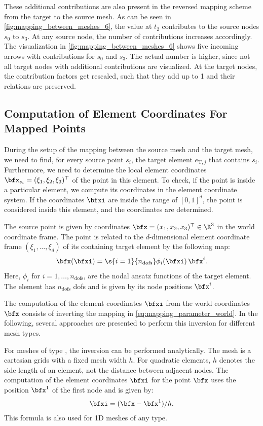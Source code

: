 These additional contributions are also present in the reversed mapping scheme from the target to the source mesh. As can be seen in \cref{fig:mapping_between_meshes_6}, the value at $t_2$ contributes to the source nodes $s_0$ to $s_3$. At any source node, the number of contributions increases accordingly. The visualization in \cref{fig:mapping_between_meshes_6} shows five incoming arrows with contributions for $s_0$ and $s_3$. The actual number is higher, since not all target nodes with additional contributions are visualized. At the target nodes, the contribution factors get rescaled, such that they add up to 1 and their relations are preserved.

\subsection{Computation of Element Coordinates For Mapped Points}

During the setup of the mapping between the source mesh and the target mesh, we need to find, for every source point $s_i$, the target element $e_{\text{T},j}$ that contains $s_i$. Furthermore, we need to determine the local element coordinates $\bfx_{s_i} = (\xi_1,\xi_2,\xi_3)^\top$ of the point in this element. To check, if the point is inside a particular element, we compute its coordinates in the element coordinate system. If the coordinates $\bfxi$ are inside the range of $[0,1]^d$, the point is considered inside this element, and the coordinates are determined.

The source point is given by coordinates $\bfx=(x_1,x_2,x_3)^\top \in \R^3$ in the world coordinate frame. The point is related to the $d$-dimensional element coordinate frame $(\xi_1,\dots,\xi_d)$ of its containing target element by the following map:
\begin{align}\label{eq:mapping_parameter_world}
  \bfx(\bfxi) = \s{i=1}{n_\text{dofs}} \phi_i(\bfxi)\, \bfx^i.
\end{align}
Here, $\phi_i$ for $i=1,\dots,n_\text{dofs}$, are the nodal ansatz functions of the target element. The element  has $n_\text{dofs}$ dofs and is given by its node positions $\bfx^i$.

The computation of the element coordinates $\bfxi$ from the world coordinates $\bfx$ consists of inverting the mapping in \cref{eq:mapping_parameter_world}. In the following, several approaches are presented to perform this inversion for different mesh types.

For meshes of type , the inversion can be performed analytically. The mesh is a cartesian grids with a fixed mesh width $h$. For quadratic elements, $h$ denotes the side length of an element, not the distance between adjacent nodes.
The computation of the element coordinates $\bfxi$ for the point $\bfx$ uses the position $\bfx^1$ of the first node and is given by:
\begin{align*}
  \bfxi = (\bfx - \bfx^1) / h.
\end{align*}
This formula is also used for 1D meshes of any type.

